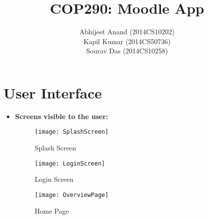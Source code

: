 \documentclass[12pt]{article}
\title{COP290: Moodle App}
\author{Abhijeet Anand (2014CS10202) \\ Kapil Kumar (2014CS50736) \\ Sourav Das (2014CS10258) }
\begin{document}
\maketitle

\section{User Interface}
\begin{itemize}
    \item \textbf{\large Screens visible to the user:}
    \bigskip
    \begin{figure}[h]
    \centering
    \begin{minipage}[b]{0.3\linewidth}
    \texttt{[image: SplashScreen]} 
    \caption*{Splash Screen}
    \label{fig:minipage1}
    \end{minipage}
    \quad
    \begin{minipage}[b]{0.3\linewidth}
    \texttt{[image: LoginScreen]} 
    \caption*{Login Screen}
    \label{fig:minipage2}
    \end{minipage}
    \quad
    \begin{minipage}[b]{0.3\linewidth}
    \texttt{[image: OverviewPage]} 
    \caption*{Home Page}
    \label{fig:minipage2}
    \end{minipage}
    \end{figure}
    
    
    

\end{itemize}
\end{document}
